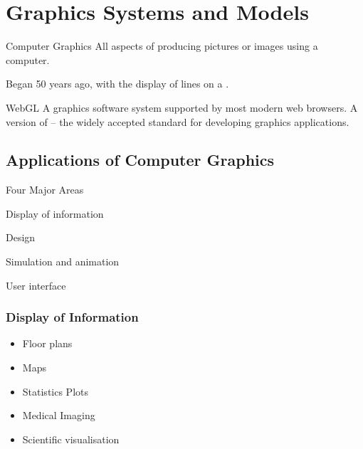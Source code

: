 \documentclass[\main/notes.tex]{subfiles}
\begin{document}
	\chapter{Graphics Systems and Models}
		\begin{definition}{Computer Graphics}
			All aspects of producing pictures or images using a computer.

			Began 50 years ago, with the display of lines on a .
		\end{definition}
		\begin{definition}{WebGL}
			A graphics software system supported by most modern web browsers.
			A version of  -- the widely accepted standard for developing graphics applications.
		\end{definition}
		\section{Applications of Computer Graphics}
			\begin{sidenote}{Four Major Areas}
				\begin{center}
					\begin{enumerate*}[itemjoin=\quad]
						\item Display of information
						\item Design
						\item Simulation and animation
						\item User interface
					\end{enumerate*}
				\end{center}
			\end{sidenote}
			\subsection{Display of Information}
				\begin{example}[Types]
					\begin{itemize}[nosep]
						\item Floor plans
						\item Maps
						\item Statistics Plots
						\item Medical Imaging\\
						\item Scientific visualisation
					\end{itemize}
				\end{example}
			\pagebreak
\end{document}
